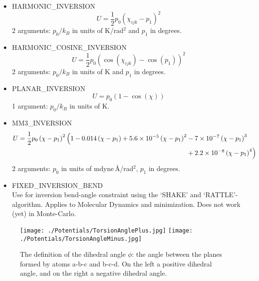 \begin{itemize}
  \item{HARMONIC\_INVERSION}\\
 \begin{equation}
  U=\frac{1}{2}p_0\left(\chi_{ijk}-p_1\right)^2
  \end{equation}
  2 arguments: $p_0/k_B$ in units of K/rad$^2$ and $p_1$ in degrees.
  \item{HARMONIC\_COSINE\_INVERSION}\\
 \begin{equation}
  U=\frac{1}{2}p_0\left(\cos\left(\chi_{ijk}\right)-\cos\left(p_1\right)\right)^2
  \end{equation}
  2 arguments: $p_0/k_B$ in units of K and $p_1$ in degrees.
  \item{PLANAR\_INVERSION}\\
 \begin{equation}
  U=p_0\left(1-\cos\left(\chi\right)\right)
  \end{equation}
  1 argument: $p_0/k_B$ in units of K.
  \item{MM3\_INVERSION}\\
  \begin{equation}
  \begin{split}
  U=\frac{1}{2}p_0 \left(\chi-p_1\right)^2\Bigl(1-0.014\left(\chi-p_1\right)+
   5.6\times10^{-5}\left(\chi-p_1\right)^2&-7\times10^{-7}\left(\chi-p_1\right)^3\\
   &+2.2\times10^{-8}\left(\chi-p_1\right)^4
   \Bigr)
  \end{split}
  \end{equation}
  2 arguments: $p_0$ in units of mdyne\,\AA/rad$^2$, $p_1$ in degrees.

  \item{FIXED\_INVERSION\_BEND}\\
   Use for inversion bend-angle constraint using the `SHAKE' and `RATTLE'-algorithm. 
   Applies to Molecular Dynamics and minimization. Does not work (yet) in Monte-Carlo.
\end{itemize}

\begin{figure}[t]
  \centering
  \texttt{[image: ./Potentials/TorsionAnglePlus.jpg]}
  \texttt{[image: ./Potentials/TorsionAngleMinus.jpg]}
  \caption{The definition of the dihedral angle $\phi$: the angle between the planes formed by atoms a-b-c and b-c-d.
   On the left a positive dihedral angle, and on the right a negative dihedral angle.}
  \label{Fig: Torsion definition}
\end{figure}

